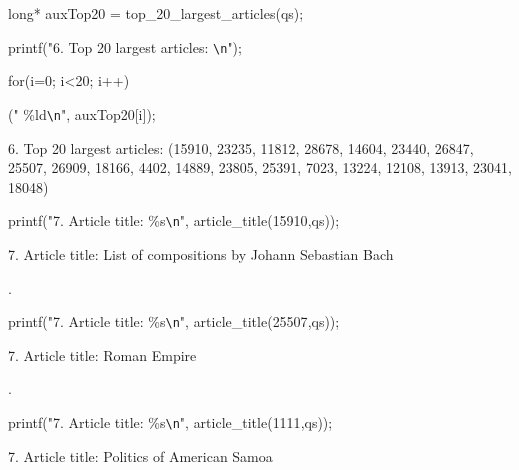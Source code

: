 \documentclass[a4paper,12pt]{report}
\newcommand\tab[1][1cm]{\hspace*{#1}}
\begin{document}
\begin{tcolorbox}[width=\textwidth,colback={darkgray},title={\sf Excerto 4.6: Top 20 Largest Articles.},outer arc=2mm,colupper=white]{\footnotesize\tt
		    
		{\color{newpink}long*} auxTop20 = {\color{lightblue}top\_20\_largest\_articles}(qs);
		
		{\color{lightblue}printf}({\color{deadgreen}"6. Top 20 largest articles:} {\color{lightblue}\texttt{\textbackslash n}}\color{deadgreen}"\color{white});
		
		{\color{newpink}for}(i{\color{newpink}=}{\color{deadorange}0}; i{\color{newpink}<}{\color{deadorange}20}; i{\color{newpink}++})
		
		\tab {\color{lightblue}printf}(\color{deadgreen}"\color{white}   {\color{deadorange}\%ld}{\color{lightblue}\texttt{\textbackslash n}}\color{deadgreen}"\color{white}, auxTop20[i]);
	
		6. Top 20 largest articles: (15910, 23235, 11812, 28678, 14604, 23440, 26847, 25507, 26909, 18166, 4402, 14889, 23805, 25391, 7023, 13224, 12108, 13913, 23041, 18048)
	}
\end{tcolorbox} 


\begin{tcolorbox}[width=\textwidth,colback={darkgray},title={\sf Excerto 4.7: Article Title.},outer arc=2mm,colupper=white]{\footnotesize\tt
		
		{\color{lightblue}printf}({\color{deadgreen}"7. Article title:} {\color{deadorange}\%s}{\color{lightblue}\texttt{\textbackslash n}}\color{deadgreen}"\color{white}, {\color{lightblue}article\_title}({\color{deadorange}15910},qs));

		7. Article title: List of compositions by Johann Sebastian Bach
		
		{\color{darkgray}.}
		
		{\color{lightblue}printf}({\color{deadgreen}"7. Article title:} {\color{deadorange}\%s}{\color{lightblue}\texttt{\textbackslash n}}\color{deadgreen}"\color{white}, {\color{lightblue}article\_title}({\color{deadorange}25507},qs)); 

		7. Article title: Roman Empire
		
		{\color{darkgray}.}
		
		{\color{lightblue}printf}({\color{deadgreen}"7. Article title:} {\color{deadorange}\%s}{\color{lightblue}\texttt{\textbackslash n}}\color{deadgreen}"\color{white}, {\color{lightblue}article\_title}({\color{deadorange}1111},qs)); 
		
		7. Article title: Politics of American Samoa
	}
\end{tcolorbox} 
\end{document}
